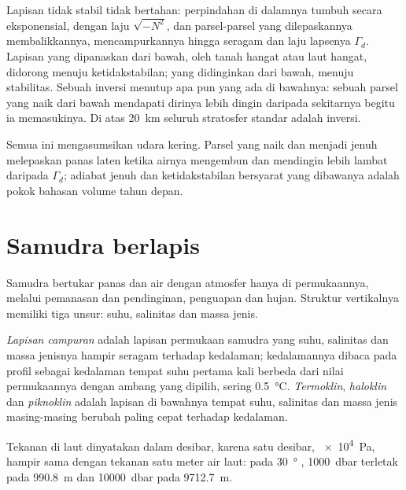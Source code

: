 Lapisan tidak stabil tidak bertahan: perpindahan di dalamnya tumbuh secara eksponensial, dengan laju $\sqrt{-N^2}$, dan parsel-parsel yang dilepaskannya membalikkannya, mencampurkannya hingga  seragam dan laju lapsenya $\Gamma_d$. Lapisan yang dipanaskan dari bawah, oleh tanah hangat atau laut hangat, didorong menuju ketidakstabilan; yang didinginkan dari bawah, menuju stabilitas. Sebuah inversi menutup apa pun yang ada di bawahnya: sebuah parsel yang naik dari bawah mendapati dirinya lebih dingin daripada sekitarnya begitu ia memasukinya. Di atas \qty{20}{km} seluruh stratosfer standar adalah inversi.

Semua ini mengasumsikan udara kering. Parsel yang naik dan menjadi jenuh melepaskan panas laten ketika airnya mengembun dan mendingin lebih lambat daripada $\Gamma_d$; adiabat jenuh dan ketidakstabilan bersyarat yang dibawanya adalah pokok bahasan volume tahun depan.

\section{Samudra berlapis}\label{sec:b1:fluid-envelopes-structure:ocean}

Samudra bertukar panas dan air dengan atmosfer hanya di permukaannya, melalui pemanasan dan pendinginan, penguapan dan hujan. Struktur vertikalnya memiliki tiga unsur: suhu, salinitas dan massa jenis.

\begin{definition}\label{def:b1:fluid-envelopes-structure:ocean-layers}
\emph{Lapisan campuran} adalah lapisan permukaan samudra yang suhu, salinitas dan massa jenisnya hampir seragam terhadap kedalaman; kedalamannya dibaca pada profil sebagai kedalaman tempat suhu pertama kali berbeda dari nilai permukaannya dengan ambang yang dipilih, sering \qty{0.5}{\celsius}. \emph{Termoklin}, \emph{haloklin} dan \emph{piknoklin} adalah lapisan di bawahnya tempat suhu, salinitas dan massa jenis masing-masing berubah paling cepat terhadap kedalaman.
\end{definition}

Tekanan di laut dinyatakan dalam desibar, karena satu desibar, \qty{e4}{Pa}, hampir sama dengan tekanan satu meter air laut: pada \qty{30}{\degree} , \qty{1000}{dbar} terletak pada \qty{990.8}{m} dan \qty{10000}{dbar} pada \qty{9712.7}{m}.

